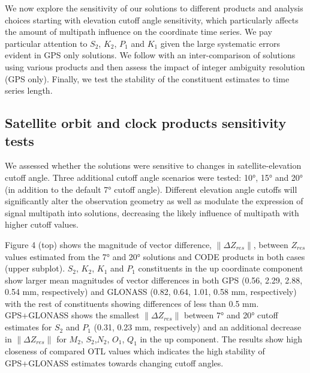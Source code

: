 \documentclass[se, manuscript]{copernicus}
\begin{document}
We now explore the sensitivity of our solutions to different products and analysis choices starting with elevation cutoff angle sensitivity, which particularly affects the amount of multipath influence on the coordinate time series. We pay particular attention to $S_2$, $K_2$, $P_1$ and $K_1$ given the large systematic errors evident in GPS only solutions. We follow with an inter-comparison of solutions using various products and then assess the impact of integer ambiguity resolution (GPS only). Finally, we test the stability of the constituent estimates to time series length. 

\subsection{Satellite orbit and clock products sensitivity tests}
We assessed whether the solutions were sensitive to changes in satellite-elevation cutoff angle. Three additional cutoff angle scenarios were tested: 10°, 15° and 20° (in addition to the default 7° cutoff angle). Different elevation angle cutoffs will significantly alter the observation geometry as well as modulate the expression of signal multipath into solutions, decreasing the likely influence of multipath with higher cutoff values.

Figure 4 (top) shows the magnitude of vector difference, $\|\Delta Z_{res}\|$, between $Z_{res}$ values estimated from the 7° and 20° solutions and CODE products in both cases (upper subplot). $S_2$, $K_2$, $K_1$ and $P_1$ constituents in the up coordinate component show larger mean magnitudes of vector differences in both GPS (0.56, 2.29, 2.88, 0.54 mm, respectively) and GLONASS (0.82, 0.64, 1.01, 0.58 mm, respectively) with the rest of constituents showing differences of less than 0.5 mm. GPS+GLONASS shows the smallest $\|\Delta Z_{res}\|$ between 7° and 20° cutoff estimates for $S_2$ and $P_1$ (0.31, 0.23 mm, respectively) and an additional decrease in $\|\Delta Z_{res}\|$ for $M_2$, $S_2$,$N_2$, $O_1$, $Q_1$ in the up component. The results show high closeness of compared OTL values which indicates the high stability of GPS+GLONASS estimates towards changing cutoff angles.
\end{document}
